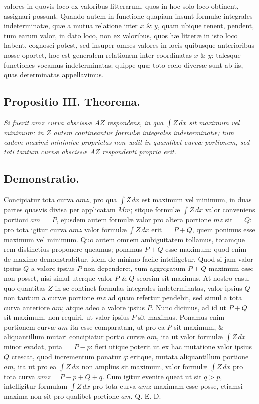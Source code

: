 valores in quovis loco ex valoribus litterarum, quos in hoc solo loco obtinent, assignari possunt. Quando autem in functione quapiam insunt formulæ integrales indeterminatæ, quæ a mutua relatione inter $x$ \& $y$, quam ubique tenent, pendent, tum earum valor, in dato loco, non ex valoribus, quos hæ litteræ in isto loco habent, cognosci potest, sed insuper omnes valores in locis quibusque anterioribus nosse oportet, hoc est generalem relationem inter coordinatas $x$ \& $y$: talesque functiones vocamus indeterminatas; quippe quæ toto cœlo diversæ sunt ab iis, quas determinatas appellavimus.

\subsection*{Propositio III. Theorema.}
\textit{Si fuerit $amz$ curva abscissæ $AZ$ respondens, in qua $\int Z\,dx$ sit maximum vel minimum; in $Z$ autem contineantur formulæ integrales indeterminatæ; tum eadem maximi minimive proprietas non cadit in quamlibet curvæ portionem, sed toti tantum curvæ abscissæ $AZ$ respondenti propria erit.}

\subsection*{Demonstratio.} Concipiatur tota curva $amz$, pro qua $\int Z\,dx$ est maximum vel minimum, in duas partes quasvis divisa per applicatam $Mm$; sitque formulæ $\int Z\,dx$ valor conveniens portioni $am$ $=P$, ejusdem autem formulæ valor pro altera portione $mz$ sit $=Q$: pro tota igitur curva $amz$ valor formulæ $\int Z\,dx$ erit $=P+Q$, quem ponimus esse maximum vel minimum. Quo autem omnem ambiguitatem tollamus, totamque rem distinctius proponere queamus; ponamus $P+Q$ esse maximum: quod enim de maximo demonstrabitur, idem de minimo facile intelligetur. Quod si jam valor ipsius $Q$ a valore ipsius $P$ non dependeret, tum aggregatum $P+Q$ maximum esse non posset, nisi simul uterque valor $P$ \& $Q$ seorsim sit maximus. At nostro casu, quo quantitas $Z$ in se continet formulas integrales indeterminatas, valor ipsius $Q$ non tantum a curvæ portione $mz$ ad quam refertur pendebit, sed simul a tota curva anteriore $am$; atque adeo a valore ipsius $P$. Nunc dicimus, ad id ut $P+Q$ sit maximum, non requiri, ut valor ipsius $P$ sit maximus. Ponamus enim portionem curvæ $am$ ita esse comparatam, ut pro ea $P$ sit maximum, \& aliquantillum mutari concipiatur portio curvæ $am$, ita ut valor formulæ $\int Z\,dx$ minor evadat, puta $=P-p$: fieri utique poterit ut ex hac mutatione valor ipsius $Q$ crescat, quod incrementum ponatur $q$: eritque, mutata aliquantillum portione $am$, ita ut pro ea $\int Z\,dx$ non amplius sit maximum, valor formulæ $\int Z\,dx$ pro tota curva $amz =P-p+Q+q$. Cum igitur evenire queat ut sit $q>p$, intelligitur formulam $\int Z\,dx$ pro tota curva $amz$ maximam esse posse, etiamsi maxima non sit pro qualibet portione $am$. Q. E. D.


